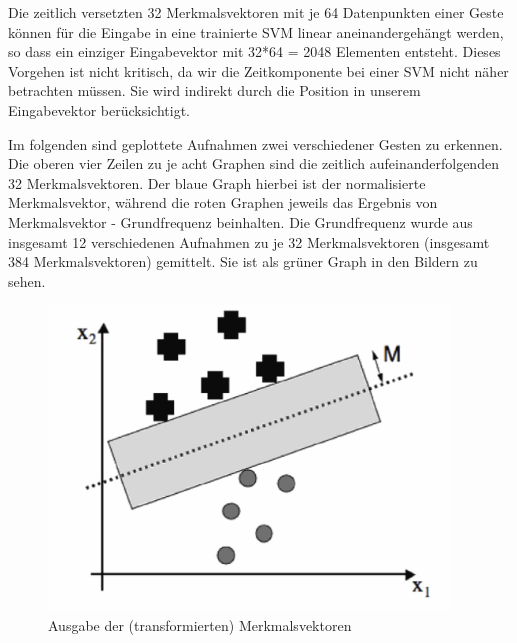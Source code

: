 Die zeitlich versetzten 32 Merkmalsvektoren mit je 64 Datenpunkten einer Geste können für die Eingabe in eine trainierte SVM linear aneinandergehängt werden, so dass ein einziger Eingabevektor mit 32*64 = 2048 Elementen entsteht. Dieses Vorgehen ist nicht kritisch, da wir die Zeitkomponente bei einer SVM nicht näher betrachten müssen. Sie wird indirekt durch die Position in unserem Eingabevektor berücksichtigt.

Im folgenden sind geplottete Aufnahmen zwei verschiedener Gesten zu erkennen. Die oberen vier Zeilen zu je acht Graphen sind die zeitlich aufeinanderfolgenden 32 Merkmalsvektoren. Der blaue Graph hierbei ist der normalisierte Merkmalsvektor, während die roten Graphen jeweils das Ergebnis von Merkmalsvektor - Grundfrequenz beinhalten. Die Grundfrequenz wurde aus insgesamt 12 verschiedenen Aufnahmen zu je 32 Merkmalsvektoren (insgesamt 384 Merkmalsvektoren) gemittelt. Sie ist als grüner Graph in den Bildern zu sehen.

\begin{figure}[h!]
  \centering
    \includegraphics[width=0.95\textwidth]{ref/images/svm_1.png}
  \caption{Ausgabe der (transformierten) Merkmalsvektoren}
\end{figure}